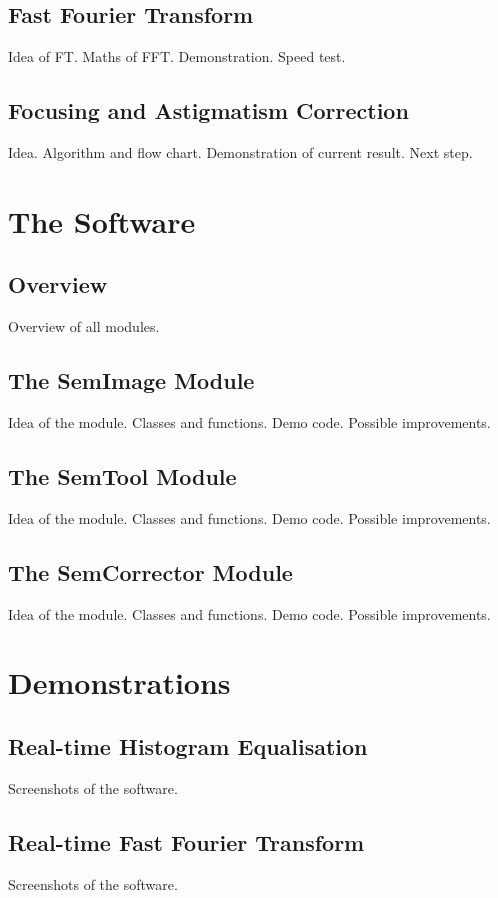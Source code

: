 \documentclass{article}
\begin{document}
\subsection{Fast Fourier Transform} 
Idea of FT.
Maths of FFT.
Demonstration.
Speed test. 

\subsection{Focusing and Astigmatism Correction}
Idea.
Algorithm and flow chart.
Demonstration of current result.
Next step.

\section{The Software}
\subsection{Overview}
Overview of all modules.

\subsection{The SemImage Module}
Idea of the module.
Classes and functions.
Demo code.
Possible improvements.

\subsection{The SemTool Module}
Idea of the module.
Classes and functions.
Demo code.
Possible improvements.

\subsection{The SemCorrector Module}
Idea of the module.
Classes and functions.
Demo code.
Possible improvements.

\section{Demonstrations}
\subsection{Real-time Histogram Equalisation}
Screenshots of the software.

\subsection{Real-time Fast Fourier Transform}
Screenshots of the software.
\end{document}
